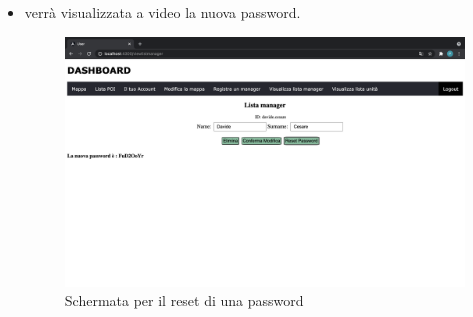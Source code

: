 \begin{itemize}
\begin{itemize}
            \item verrà visualizzata a video la nuova password.
            \begin{figure}[H]
                \centering
                \includegraphics[scale=0.12]{res/images/resetpassowrd2.png}
                \caption{Schermata per il reset di una password}
            \end{figure}
        \end{itemize}
\end{itemize}


